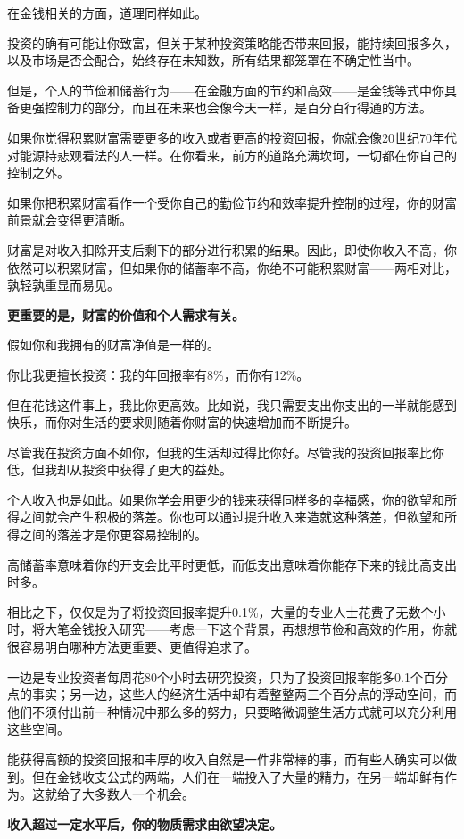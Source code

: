 在金钱相关的方面，道理同样如此。

投资的确有可能让你致富，但关于某种投资策略能否带来回报，能持续回报多久，以及市场是否会配合，始终存在未知数，所有结果都笼罩在不确定性当中。

但是，个人的节俭和储蓄行为——在金融方面的节约和高效——是金钱等式中你具备更强控制力的部分，而且在未来也会像今天一样，是百分百行得通的方法。

如果你觉得积累财富需要更多的收入或者更高的投资回报，你就会像20世纪70年代对能源持悲观看法的人一样。在你看来，前方的道路充满坎坷，一切都在你自己的控制之外。

如果你把积累财富看作一个受你自己的勤俭节约和效率提升控制的过程，你的财富前景就会变得更清晰。

财富是对收入扣除开支后剩下的部分进行积累的结果。因此，即使你收入不高，你依然可以积累财富，但如果你的储蓄率不高，你绝不可能积累财富——两相对比，孰轻孰重显而易见。

\textbf{更重要的是，财富的价值和个人需求有关。}

假如你和我拥有的财富净值是一样的。

你比我更擅长投资：我的年回报率有8\%，而你有12\%。

但在花钱这件事上，我比你更高效。比如说，我只需要支出你支出的一半就能感到快乐，而你对生活的要求则随着你财富的快速增加而不断提升。

尽管我在投资方面不如你，但我的生活却过得比你好。尽管我的投资回报率比你低，但我却从投资中获得了更大的益处。

个人收入也是如此。如果你学会用更少的钱来获得同样多的幸福感，你的欲望和所得之间就会产生积极的落差。你也可以通过提升收入来造就这种落差，但欲望和所得之间的落差才是你更容易控制的。

高储蓄率意味着你的开支会比平时更低，而低支出意味着你能存下来的钱比高支出时多。

相比之下，仅仅是为了将投资回报率提升0.1\%，大量的专业人士花费了无数个小时，将大笔金钱投入研究——考虑一下这个背景，再想想节俭和高效的作用，你就很容易明白哪种方法更重要、更值得追求了。

一边是专业投资者每周花80个小时去研究投资，只为了投资回报率能多0.1个百分点的事实；另一边，这些人的经济生活中却有着整整两三个百分点的浮动空间，而他们不须付出前一种情况中那么多的努力，只要略微调整生活方式就可以充分利用这些空间。

能获得高额的投资回报和丰厚的收入自然是一件非常棒的事，而有些人确实可以做到。但在金钱收支公式的两端，人们在一端投入了大量的精力，在另一端却鲜有作为。这就给了大多数人一个机会。

\textbf{收入超过一定水平后，你的物质需求由欲望决定。}

